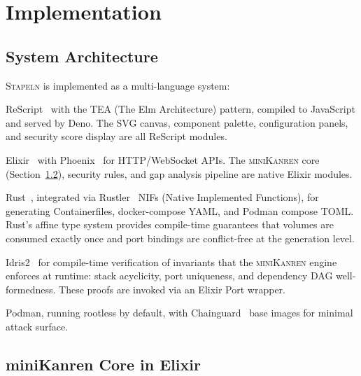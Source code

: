\documentclass[11pt,twocolumn]{article}
\newcommand{\stapeln}{\textsc{Stapeln}\xspace}
\newcommand{\minikanren}{\textsc{miniKanren}\xspace}
\begin{document}
\section{Implementation}
\label{sec:impl}

\subsection{System Architecture}
\label{sec:impl-arch}

\stapeln is implemented as a multi-language system:

\begin{description}[leftmargin=*]
\item[Frontend:] ReScript~\cite{rescript2024} with the TEA (The Elm
  Architecture) pattern, compiled to JavaScript and served by Deno.
  The SVG canvas, component palette, configuration panels, and
  security score display are all ReScript modules.

\item[Backend:] Elixir~\cite{elixir2024} with Phoenix~\cite{phoenix2024}
  for HTTP/WebSocket APIs. The \minikanren core
  (Section~\ref{sec:engine-impl}), security rules, and gap analysis
  pipeline are native Elixir modules.

\item[Code generation:] Rust~\cite{rust2024}, integrated via
  Rustler~\cite{rustler2024} NIFs (Native Implemented Functions), for
  generating Containerfiles, docker-compose YAML, and Podman compose
  TOML. Rust's affine type system provides compile-time guarantees
  that volumes are consumed exactly once and port bindings are
  conflict-free at the generation level.

\item[Formal proofs:] Idris2~\cite{brady2021} for compile-time
  verification of invariants that the \minikanren engine enforces at
  runtime: stack acyclicity, port uniqueness, and dependency DAG
  well-formedness. These proofs are invoked via an Elixir Port
  wrapper.

\item[Container runtime:] Podman, running rootless by default, with
  Chainguard~\cite{chainguard2024} base images for minimal attack
  surface.
\end{description}

\subsection{miniKanren Core in Elixir}
\label{sec:engine-impl}
\end{document}
